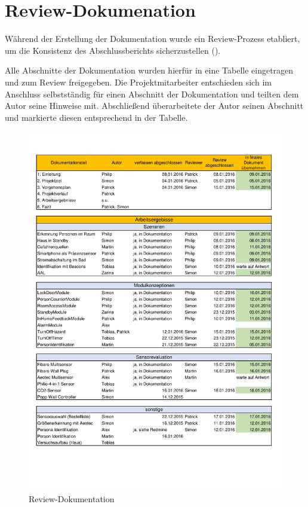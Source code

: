 
\chapter{Review-Dokumenation}
\label{chap:reviewDokumenation}

Während der Erstellung der Dokumentation wurde ein Review-Prozess etabliert, um die Konsistenz des Abschlussberichts sicherzustellen ().

Alle Abschnitte der Dokumentation wurden hierfür in eine Tabelle eingetragen und zum Review freigegeben. Die Projektmitarbeiter entschieden sich im Anschluss selbstständig für einen Abschnitt der Dokumentation und teilten dem Autor seine Hinweise mit. Abschließend überarbeitete der Autor seinen Abschnitt und markierte diesen entsprechend in der Tabelle.

\begin{figure}[h!]
	\centering
	\includegraphics[width=1.0\textwidth]{img/Review-Dokumentation/Review-Dokumentation.pdf}
	\caption{Review-Dokumentation}
	\label{fig:reviewDokumentation}
\end{figure}